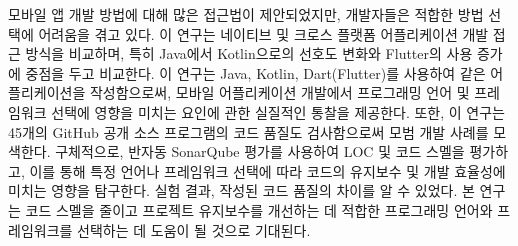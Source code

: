 
\begin{eabstract}
    모바일 앱 개발 방법에 대해 많은 접근법이 제안되었지만, 개발자들은 적합한 방법 선택에 어려움을 겪고 있다. 이 연구는 네이티브 및 크로스 플랫폼 어플리케이션 개발 접근 방식을 비교하며, 특히 Java에서 Kotlin으로의 선호도 변화와 Flutter의 사용 증가에 중점을 두고 비교한다. 이 연구는 Java, Kotlin, Dart(Flutter)를 사용하여 같은 어플리케이션을 작성함으로써, 모바일 어플리케이션 개발에서 프로그래밍 언어 및 프레임워크 선택에 영향을 미치는 요인에 관한 실질적인 통찰을 제공한다. 또한, 이 연구는 45개의 GitHub 공개 소스 프로그램의 코드 품질도 검사함으로써 모범 개발 사례를 모색한다. 구체적으로, 반자동 SonarQube 평가를 사용하여 LOC 및 코드 스멜을 평가하고, 이를 통해 특정 언어나 프레임워크 선택에 따라 코드의 유지보수 및 개발 효율성에 미치는 영향을 탐구한다. 실험 결과, 작성된 코드 품질의 차이를 알 수 있었다. 본 연구는 코드 스멜을 줄이고 프로젝트 유지보수를 개선하는 데 적합한 프로그래밍 언어와 프레임워크를 선택하는 데 도움이 될 것으로 기대된다.
\end{eabstract}
